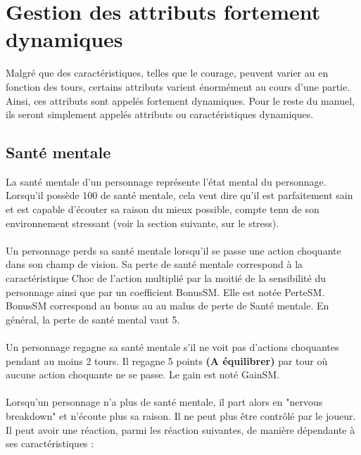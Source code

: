 \section{Gestion des attributs fortement dynamiques}
Malgré que des caractéristiques, telles que le courage, peuvent varier au en fonction des tours, certains attributs varient énormément au cours d'une partie. Ainsi, ces attributs sont appelés fortement dynamiques. Pour le reste du manuel, ils seront simplement appelés attributs ou caractéristiques dynamiques.
\subsection{Santé mentale}
La santé mentale d'un personnage représente l'état mental du personnage. Lorsqu'il possède 100 de santé mentale, cela veut dire qu'il est parfaitement sain et est capable d'écouter sa raison du mieux possible, compte tenu de son environnement stressant (voir la section suivante, sur le stress).
\\\\
Un personnage perds sa santé mentale lorsqu'il se passe une action choquante dans son champ de vision. Sa perte de santé mentale correspond à la caractéristique Choc de l'action multiplié par la moitié de la sensibilité du personnage ainsi que par un coefficient BonusSM. Elle est notée PerteSM. BonusSM correspond au bonus au au malus de perte de Santé mentale. En général, la perte de santé mental vaut 5.
\\\\
Un personnage regagne sa santé mentale s'il ne voit pas d'actions choquantes pendant au moins 2 tours. Il regagne 5 points \textbf{(A équilibrer)} par tour où aucune action choquante ne se passe. Le gain est noté GainSM.
\\\\
Lorsqu'un personnage n'a plus de santé mentale, il part alors en "nervous breakdown" et n'écoute plus sa raison. Il ne peut plus être contrôlé par le joueur. Il peut avoir une réaction, parmi les réaction suivantes, de manière dépendante à ses caractéristiques :
